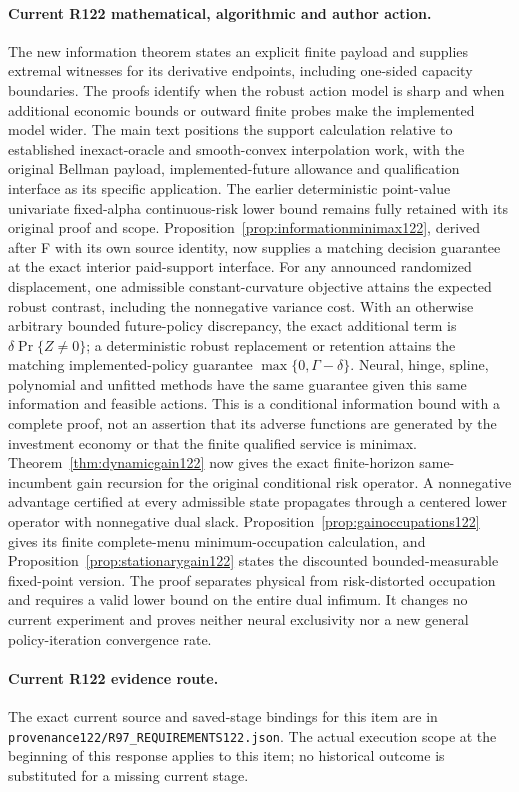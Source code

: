 \paragraph{Current R122 mathematical, algorithmic and author action.}
The new information theorem states an explicit finite payload and supplies extremal witnesses for its derivative endpoints, including one-sided capacity boundaries. The proofs identify when the robust action model is sharp and when additional economic bounds or outward finite probes make the implemented model wider. The main text positions the support calculation relative to established inexact-oracle and smooth-convex interpolation work, with the original Bellman payload, implemented-future allowance and qualification interface as its specific application. The earlier deterministic point-value univariate fixed-alpha continuous-risk lower bound remains fully retained with its original proof and scope. Proposition~\ref{prop:informationminimax122}, derived after F with its own source identity, now supplies a matching decision guarantee at the exact interior paid-support interface. For any announced randomized displacement, one admissible constant-curvature objective attains the expected robust contrast, including the nonnegative variance cost. With an otherwise arbitrary bounded future-policy discrepancy, the exact additional term is $\delta\Pr\{Z\ne0\}$; a deterministic robust replacement or retention attains the matching implemented-policy guarantee $\max\{0,\Gamma-\delta\}$. Neural, hinge, spline, polynomial and unfitted methods have the same guarantee given this same information and feasible actions. This is a conditional information bound with a complete proof, not an assertion that its adverse functions are generated by the investment economy or that the finite qualified service is minimax. Theorem~\ref{thm:dynamicgain122} now gives the exact finite-horizon same-incumbent gain recursion for the original conditional risk operator. A nonnegative advantage certified at every admissible state propagates through a centered lower operator with nonnegative dual slack. Proposition~\ref{prop:gainoccupations122} gives its finite complete-menu minimum-occupation calculation, and Proposition~\ref{prop:stationarygain122} states the discounted bounded-measurable fixed-point version. The proof separates physical from risk-distorted occupation and requires a valid lower bound on the entire dual infimum. It changes no current experiment and proves neither neural exclusivity nor a new general policy-iteration convergence rate.
\paragraph{Current R122 evidence route.}
The exact current source and saved-stage bindings for this item are in \nolinkurl{provenance122/R97_REQUIREMENTS122.json}. The actual execution scope at the beginning of this response applies to this item; no historical outcome is substituted for a missing current stage.
